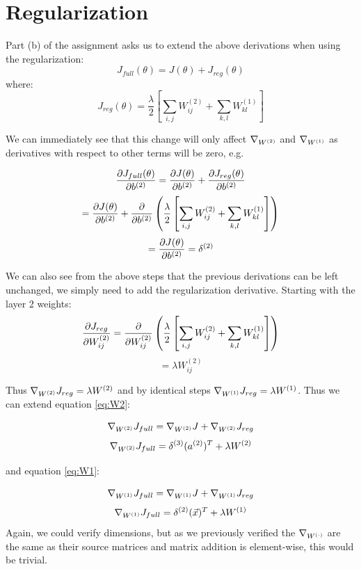 \documentclass[]{article}
\newcommand{\deriv}[2]{%
	\ensuremath{\frac{\partial {#1}}{\partial {#2}}}}
\newcommand{\slayer}[3]{ %
	\ensuremath{{#1}^{(#2)}_{#3}}}
\newcommand{\vlayer}[2]{ %
	\ensuremath{{#1}^{(#2)}}}
\begin{document}
\section{Regularization}
Part (b) of the assignment asks us to extend the above derivations when using the regularization:
$$J_{full}(\theta) = J(\theta) + J_{reg}(\theta)$$
where:
$$J_{reg}(\theta) = \frac{\lambda}{2}\left[ \sum_{i,j} \slayer{W}{2}{ij} + \sum_{k,l} \slayer{W}{1}{kl} \right]$$

We can immediately see that this change will only affect $\nabla_{\vlayer{W}{2}}$ and $\nabla_{\vlayer{W}{1}}$ as derivatives with respect to other terms will be zero, e.g. 

$$\deriv{J_{full}(\theta)}{\vlayer{b}{2}} = \deriv{J(\theta)}{\vlayer{b}{2}}  + \deriv{J_{reg}(\theta)}{\vlayer{b}{2}}$$
$$ = \deriv{J(\theta)}{\vlayer{b}{2}} + \deriv{}{\vlayer{b}{2}}\left(\frac{\lambda}{2}\left[ \sum_{i,j} \slayer{W}{2}{ij} + \sum_{k,l} \slayer{W}{1}{kl} \right]\right)$$
$$ = \deriv{J(\theta)}{\vlayer{b}{2}} = \vlayer{\delta}{2}$$

We can also see from the above steps that the previous derivations can be left unchanged, we simply need to add the regularization derivative. Starting with the layer 2 weights:
$$\deriv{J_{reg}}{\slayer{W}{2}{ij}} = \deriv{}{\slayer{W}{2}{ij}}\left(\frac{\lambda}{2}\left[ \sum_{i,j} \slayer{W}{2}{ij} + \sum_{k,l} \slayer{W}{1}{kl} \right]\right)$$
$$ = \lambda\slayer{W}{2}{ij}$$

Thus $\nabla_{\vlayer{W}{2}}J_{reg} = \lambda\vlayer{W}{2}$ and by identical steps $\nabla_{\vlayer{W}{1}}J_{reg} = \lambda\vlayer{W}{1}$. Thus we can extend equation \ref{eq:W2}:

$$\nabla_{\vlayer{W}{2}}J_{full} = \nabla_{\vlayer{W}{2}}J + \nabla_{\vlayer{W}{2}}J_{reg}$$
\begin{equation}
\nabla_{\vlayer{W}{2}}J_{full} = \vlayer{\delta}{3} (\vlayer{a}{2})^T + \lambda\vlayer{W}{2}
\end{equation}

and equation \ref{eq:W1}:

$$\nabla_{\vlayer{W}{1}}J_{full} = \nabla_{\vlayer{W}{1}}J + \nabla_{\vlayer{W}{1}}J_{reg}$$
\begin{equation}
\nabla_{\vlayer{W}{1}}J_{full} = \vlayer{\delta}{2}(\vec{x})^T + \lambda\vlayer{W}{1}
\end{equation}
Again, we could verify dimensions, but as we previously verified the $\nabla_{\vlayer{W}{\cdot}}$ are the same as their source matrices and matrix addition is element-wise, this would be trivial.
\end{document}
